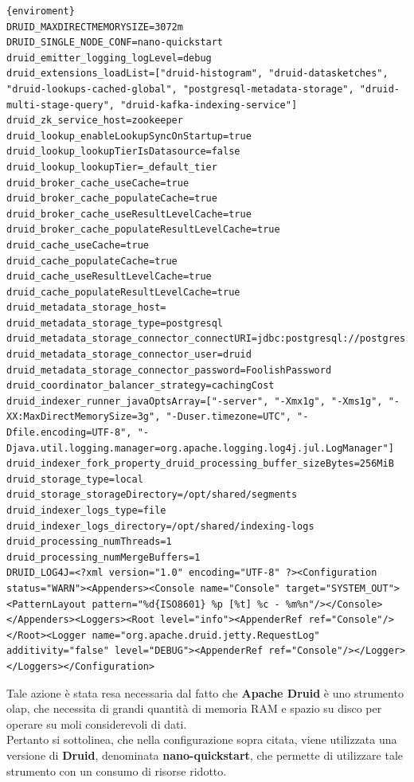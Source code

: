 \begin{lstlisting}[caption=\texttt{enviroment}, label=8st:file]{enviroment}
DRUID_MAXDIRECTMEMORYSIZE=3072m
DRUID_SINGLE_NODE_CONF=nano-quickstart
druid_emitter_logging_logLevel=debug
druid_extensions_loadList=["druid-histogram", "druid-datasketches", "druid-lookups-cached-global", "postgresql-metadata-storage", "druid-multi-stage-query", "druid-kafka-indexing-service"]
druid_zk_service_host=zookeeper
druid_lookup_enableLookupSyncOnStartup=true
druid_lookup_lookupTierIsDatasource=false
druid_lookup_lookupTier=_default_tier
druid_broker_cache_useCache=true
druid_broker_cache_populateCache=true
druid_broker_cache_useResultLevelCache=true
druid_broker_cache_populateResultLevelCache=true
druid_cache_useCache=true
druid_cache_populateCache=true
druid_cache_useResultLevelCache=true
druid_cache_populateResultLevelCache=true
druid_metadata_storage_host=
druid_metadata_storage_type=postgresql
druid_metadata_storage_connector_connectURI=jdbc:postgresql://postgres:5432/druid
druid_metadata_storage_connector_user=druid
druid_metadata_storage_connector_password=FoolishPassword
druid_coordinator_balancer_strategy=cachingCost
druid_indexer_runner_javaOptsArray=["-server", "-Xmx1g", "-Xms1g", "-XX:MaxDirectMemorySize=3g", "-Duser.timezone=UTC", "-Dfile.encoding=UTF-8", "-Djava.util.logging.manager=org.apache.logging.log4j.jul.LogManager"]
druid_indexer_fork_property_druid_processing_buffer_sizeBytes=256MiB
druid_storage_type=local
druid_storage_storageDirectory=/opt/shared/segments
druid_indexer_logs_type=file
druid_indexer_logs_directory=/opt/shared/indexing-logs
druid_processing_numThreads=1
druid_processing_numMergeBuffers=1
DRUID_LOG4J=<?xml version="1.0" encoding="UTF-8" ?><Configuration status="WARN"><Appenders><Console name="Console" target="SYSTEM_OUT"><PatternLayout pattern="%d{ISO8601} %p [%t] %c - %m%n"/></Console></Appenders><Loggers><Root level="info"><AppenderRef ref="Console"/></Root><Logger name="org.apache.druid.jetty.RequestLog" additivity="false" level="DEBUG"><AppenderRef ref="Console"/></Logger></Loggers></Configuration>
\end{lstlisting}
Tale azione è stata resa necessaria dal fatto che \textbf{Apache Druid} è uno strumento \gls{olap}{}, che necessita di grandi quantità di memoria RAM e spazio su disco per operare 
su moli considerevoli di dati.\\
Pertanto si sottolinea, che nella configurazione sopra citata, viene utilizzata una versione di \textbf{Druid}, denominata \textbf{nano-quickstart}, che permette di utilizzare tale strumento con un consumo di risorse ridotto.
